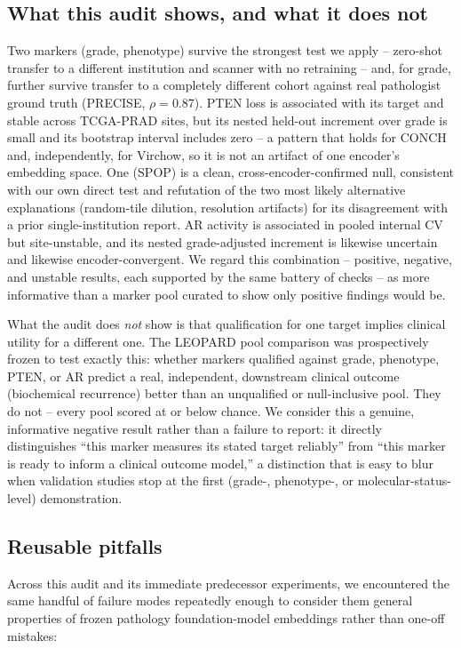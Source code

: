 \subsection{What this audit shows, and what it does not}

Two markers (grade, phenotype) survive the strongest test we apply -- zero-shot transfer to a
different institution and scanner with no retraining -- and, for grade, further survive
transfer to a completely different cohort against real pathologist ground truth (PRECISE,
$\rho=0.87$). PTEN loss is associated with its target and stable across TCGA-PRAD sites, but
its nested held-out increment over grade is small and its bootstrap interval includes zero --
a pattern that holds for CONCH and, independently, for Virchow, so it is not an artifact of one
encoder's embedding space. One (SPOP) is a clean, cross-encoder-confirmed null, consistent with
our own direct test and refutation of the two most likely alternative explanations (random-tile
dilution, resolution artifacts) for its disagreement with a prior single-institution report. AR
activity is associated in pooled internal CV but site-unstable, and its nested grade-adjusted
increment is likewise uncertain and likewise encoder-convergent. We regard this combination --
positive, negative, and unstable results, each supported by the same battery of checks -- as
more informative than a marker pool curated to show only positive findings would be.

What the audit does \emph{not} show is that qualification for one target implies clinical
utility for a different one. The LEOPARD pool comparison was prospectively frozen to test
exactly this: whether markers qualified against grade, phenotype, PTEN, or AR predict a real,
independent, downstream clinical outcome (biochemical recurrence) better than an unqualified
or null-inclusive pool. They do not -- every pool scored at or below chance. We consider this
a genuine, informative negative result rather than a failure to report: it directly
distinguishes ``this marker measures its stated target reliably'' from ``this marker is ready
to inform a clinical outcome model,'' a distinction that is easy to blur when validation
studies stop at the first (grade-, phenotype-, or molecular-status-level) demonstration.

\subsection{Reusable pitfalls}

Across this audit and its immediate predecessor experiments, we encountered the same handful
of failure modes repeatedly enough to consider them general properties of frozen pathology
foundation-model embeddings rather than one-off mistakes:

